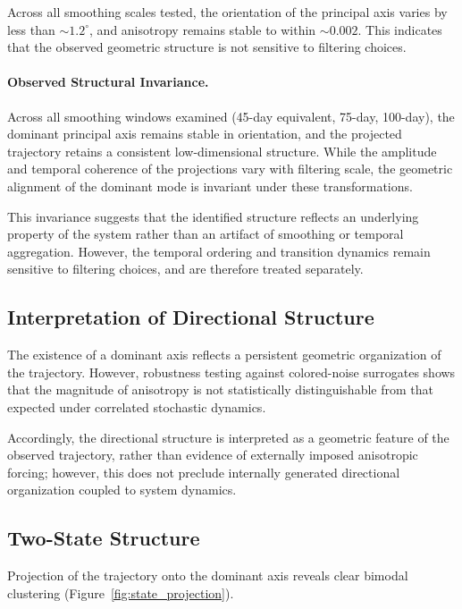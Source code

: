 \documentclass[twocolumn,9pt]{revtex4-2}
\begin{document}
Across all smoothing scales tested, the orientation of the principal axis varies by less than $\sim 1.2^\circ$, and anisotropy remains stable to within $\sim 0.002$. This indicates that the observed geometric structure is not sensitive to filtering choices.

\paragraph{Observed Structural Invariance.}
Across all smoothing windows examined (45-day equivalent, 75-day, 100-day), the dominant principal axis remains stable in orientation, and the projected trajectory retains a consistent low-dimensional structure. While the amplitude and temporal coherence of the projections vary with filtering scale, the geometric alignment of the dominant mode is invariant under these transformations.

This invariance suggests that the identified structure reflects an underlying property of the system rather than an artifact of smoothing or temporal aggregation. However, the temporal ordering and transition dynamics remain sensitive to filtering choices, and are therefore treated separately.

\subsection{Interpretation of Directional Structure}
\label{subsec:interpretation_of_directional_structure}

The existence of a dominant axis reflects a persistent geometric organization of the trajectory. However, robustness testing against colored-noise surrogates shows that the magnitude of anisotropy is not statistically distinguishable from that expected under correlated stochastic dynamics.

Accordingly, the directional structure is interpreted as a geometric feature of the observed trajectory, rather than evidence of externally imposed anisotropic forcing; however, this does not preclude internally generated directional organization coupled to system dynamics.

\subsection{Two-State Structure}
\label{subsec:two_state_structure}

Projection of the trajectory onto the dominant axis reveals clear bimodal clustering (Figure~\ref{fig:state_projection}).
\end{document}
